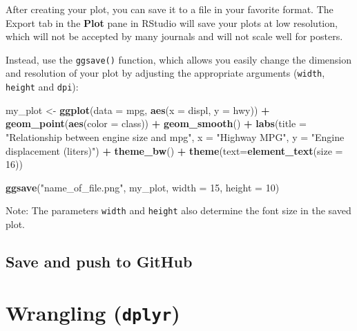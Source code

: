 \documentclass[]{book}
\newenvironment{Shaded}{\begin{snugshade}}{\end{snugshade}}
\newcommand{\KeywordTok}[1]{\textcolor[rgb]{0.13,0.29,0.53}{\textbf{#1}}}
\newcommand{\DataTypeTok}[1]{\textcolor[rgb]{0.13,0.29,0.53}{#1}}
\newcommand{\DecValTok}[1]{\textcolor[rgb]{0.00,0.00,0.81}{#1}}
\newcommand{\StringTok}[1]{\textcolor[rgb]{0.31,0.60,0.02}{#1}}
\newcommand{\OperatorTok}[1]{\textcolor[rgb]{0.81,0.36,0.00}{\textbf{#1}}}
\newcommand{\NormalTok}[1]{#1}
\theoremstyle{definition}
\theoremstyle{definition}
\theoremstyle{definition}
\theoremstyle{remark}
\begin{document}
After creating your plot, you can save it to a file in your favorite
format. The Export tab in the \textbf{Plot} pane in RStudio will save
your plots at low resolution, which will not be accepted by many
journals and will not scale well for posters.

Instead, use the \texttt{ggsave()} function, which allows you easily
change the dimension and resolution of your plot by adjusting the
appropriate arguments (\texttt{width}, \texttt{height} and
\texttt{dpi}):

\begin{Shaded}
\begin{Highlighting}[]
\NormalTok{my_plot <-}\StringTok{ }\KeywordTok{ggplot}\NormalTok{(}\DataTypeTok{data =}\NormalTok{ mpg, }\KeywordTok{aes}\NormalTok{(}\DataTypeTok{x =}\NormalTok{ displ, }\DataTypeTok{y =}\NormalTok{ hwy)) }\OperatorTok{+}\StringTok{ }
\StringTok{  }\KeywordTok{geom_point}\NormalTok{(}\KeywordTok{aes}\NormalTok{(}\DataTypeTok{color =}\NormalTok{ class)) }\OperatorTok{+}\StringTok{ }
\StringTok{  }\KeywordTok{geom_smooth}\NormalTok{() }\OperatorTok{+}
\StringTok{  }\KeywordTok{labs}\NormalTok{(}\DataTypeTok{title =} \StringTok{"Relationship between engine size and mpg"}\NormalTok{,}
       \DataTypeTok{x =} \StringTok{"Highway MPG"}\NormalTok{,}
       \DataTypeTok{y =} \StringTok{"Engine displacement (liters)"}\NormalTok{) }\OperatorTok{+}
\StringTok{  }\KeywordTok{theme_bw}\NormalTok{() }\OperatorTok{+}
\StringTok{  }\KeywordTok{theme}\NormalTok{(}\DataTypeTok{text=}\KeywordTok{element_text}\NormalTok{(}\DataTypeTok{size =} \DecValTok{16}\NormalTok{))}

\KeywordTok{ggsave}\NormalTok{(}\StringTok{"name_of_file.png"}\NormalTok{, my_plot, }\DataTypeTok{width =} \DecValTok{15}\NormalTok{, }\DataTypeTok{height =} \DecValTok{10}\NormalTok{)}
\end{Highlighting}
\end{Shaded}

Note: The parameters \texttt{width} and \texttt{height} also determine
the font size in the saved plot.

\section{Save and push to GitHub}\label{save-and-push-to-github}

\chapter{\texorpdfstring{Wrangling
(\texttt{dplyr})}{Wrangling (dplyr)}}\label{dplyr}
\end{document}
